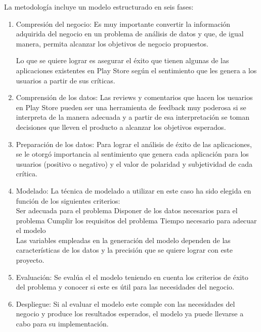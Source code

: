 \documentclass[conference]{IEEEtran}
\begin{document}
La metodología incluye un modelo estructurado en seis fases:\\

\begin{enumerate}
\item Compresión del negocio: Es muy importante convertir la información adquirida del negocio en un problema de análisis de datos y que, de igual manera, permita alcanzar los objetivos de negocio propuestos.

Lo que se quiere lograr es asegurar el éxito que tienen algunas de las aplicaciones existentes en Play Store según el sentimiento que les genera a los usuarios a partir de sus críticas.\\


\item Comprensión de los datos:
Las reviews y comentarios que hacen los usuarios en Play Store pueden ser una herramienta de feedback muy poderosa si se interpreta de la manera adecuada y a partir de esa interpretación se toman decisiones que lleven el producto a alcanzar los objetivos esperados.\\


\item Preparación de los datos: 
Para lograr el análisis de éxito de las aplicaciones, se le otorgó importancia al sentimiento que genera cada aplicación para los usuarios (positivo o negativo) y el valor de polaridad y subjetividad de cada crítica.\\


\item Modelado:
La técnica de modelado a utilizar en este caso ha sido elegida en función de los siguientes criterios:\\
Ser adecuada para el problema
Disponer de los datos necesarios para el problema
Cumplir los requisitos del problema
Tiempo necesario para adecuar el modelo\\

Las variables empleadas en la generación del modelo dependen de las características de los datos y la precisión que se quiere lograr con este proyecto.\\


\item Evaluación:
Se evalúa el el modelo teniendo en cuenta los criterios de éxito del problema y conocer si este es útil para las necesidades del negocio.\\


\item Despliegue: Si al evaluar el modelo este comple con las necesidades del negocio y produce los resultados esperados, el modelo ya puede llevarse a cabo para su implementación.

\end{enumerate}
\end{document}
